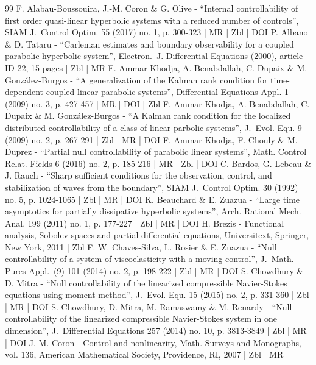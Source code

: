 \documentclass[10pt]{amsart}
\theoremstyle{plain}
\theoremstyle{definition}
\theoremstyle{remark}
\begin{document}
\begin{thebibliography}{99}
F. Alabau-Boussouira, J.-M. Coron \& G. Olive - “Internal controllability of first order quasi-linear hyperbolic systems with a reduced number of controls”, SIAM J. Control Optim. 55 (2017) no. 1, p. 300-323 | MR | Zbl | DOI
P. Albano \& D. Tataru - “Carleman estimates and boundary observability for a coupled parabolic-hyperbolic system”, Electron. J. Differential Equations (2000), article ID 22, 15 pages | Zbl | MR
F. Ammar Khodja, A. Benabdallah, C. Dupaix \& M. González-Burgos - “A generalization of the Kalman rank condition for time-dependent coupled linear parabolic systems”, Differential Equations Appl. 1 (2009) no. 3, p. 427-457 | MR | DOI | Zbl
F. Ammar Khodja, A. Benabdallah, C. Dupaix \& M. González-Burgos - “A Kalman rank condition for the localized distributed controllability of a class of linear parbolic systems”, J. Evol. Equ. 9 (2009) no. 2, p. 267-291 | Zbl | MR | DOI
F. Ammar Khodja, F. Chouly \& M. Duprez - “Partial null controllability of parabolic linear systems”, Math. Control Relat. Fields 6 (2016) no. 2, p. 185-216 | MR | Zbl | DOI
C. Bardos, G. Lebeau \& J. Rauch - “Sharp sufficient conditions for the observation, control, and stabilization of waves from the boundary”, SIAM J. Control Optim. 30 (1992) no. 5, p. 1024-1065 | Zbl | MR | DOI
K. Beauchard \& E. Zuazua - “Large time asymptotics for partially dissipative hyperbolic systems”, Arch. Rational Mech. Anal. 199 (2011) no. 1, p. 177-227 | Zbl | MR | DOI
H. Brezis - Functional analysis, Sobolev spaces and partial differential equations, Universitext, Springer, New York, 2011 | Zbl
F. W. Chaves-Silva, L. Rosier \& E. Zuazua - “Null controllability of a system of viscoelasticity with a moving control”, J. Math. Pures Appl. (9) 101 (2014) no. 2, p. 198-222 | Zbl | MR | DOI
S. Chowdhury \& D. Mitra - “Null controllability of the linearized compressible Navier-Stokes equations using moment method”, J. Evol. Equ. 15 (2015) no. 2, p. 331-360 | Zbl | MR | DOI
S. Chowdhury, D. Mitra, M. Ramaswamy \& M. Renardy - “Null controllability of the linearized compressible Navier-Stokes system in one dimension”, J. Differential Equations 257 (2014) no. 10, p. 3813-3849 | Zbl | MR | DOI
J.-M. Coron - Control and nonlinearity, Math. Surveys and Monographs, vol. 136, American Mathematical Society, Providence, RI, 2007 | Zbl | MR

\end{thebibliography}
\end{document}
